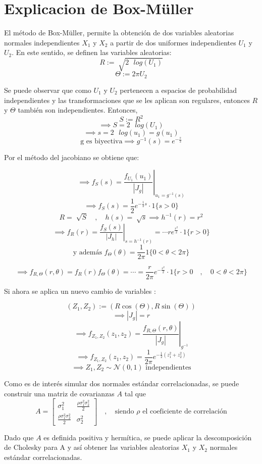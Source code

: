 \documentclass{article}
\begin{document}
\section{Explicacion de Box-Müller}

El método de Box-Müller, permite la obtención de dos variables aleatorias normales independientes $X_1$ y $X_2$ a partir de dos uniformes independientes $U_1$ y $U_2$. En este sentido, se definen las variables aleatorias:
\[	R := \sqrt[]{2 \textrm{ } log (U_1)}	\]
\[	\Theta := 2 \pi U_2	\]

Se puede observar que como $U_1$ y $U_2$ pertenecen a espacios de probabilidad independientes y las transformaciones que se les aplican son regulares, entonces $R$ y $\Theta$ también son independientes. Entonces,
\[	S := R^2	\]
\[	\implies S = 2 \textrm{ } log (U_1)	\]
\[	\implies s = 2 \textrm{ } log (u_1)	= g(u_1)\]
\[	\textrm{g es biyectiva} \implies g^{-1}(s) = e^{-\frac{s}{2}} \]

Por el método del jacobiano se obtiene que:

\[	\implies f_{S}(s) = \left.\frac{f_{U_1}(u_1)}{| J_g |}\right|_{u_1=g^{-1}(s)} \]
\[	\implies f_{S}(s) = \frac{1}{2} e^{-\frac{1}{2}s} \cdot 1 \{ s>0\} \]
\[	R = \sqrt[]{S} \quad,\quad	h(s)=\sqrt[]{s}	\implies h^{-1}(r)= r^2\]
\[	\implies f_{R}(r) = \left.\frac{f_{S}(s)}{| J_h |}\right|_{s=h^{-1}(r)} = \cdots r e^{\frac{r^2}{2}} \cdot 1 \{ r>0\} \]
\[ \textrm{y además } f_\Theta (\theta) = \frac{1}{2 \pi} 1 \{ 0 < \theta < 2 \pi \}\]

\[\implies f_{R,\Theta}(r,\theta)= f_{R}(r) f_\Theta (\theta) = \cdots = \frac{r}{2 \pi} e^{-\frac{r^2}{2}} \cdot 1 \{r>0 \quad,\quad 0 < \theta < 2 \pi \}\]

Si ahora se aplica un nuevo cambio de variables :

\[ (Z_1,Z_2) := (R \cos (\Theta), R \sin (\Theta))\]
\[\implies | J_g | = r \]
\[\implies f_{Z_1,Z_2}(z_1,z_2)= \left.\frac{f_{R,\Theta}(r,\theta)}{| J_g |}\right|_{g^{-1}}\]
\[\implies f_{Z_1,Z_2}(z_1,z_2)= \frac{1}{2\pi} e^{-\frac{1}{2}(z_1^2 + z_2^2)}\]
\[\implies Z_1,Z_2 \sim \mathcal{N}(0 , 1) \textrm{ independientes}\]

Como es de interés simular dos normales estándar correlacionadas, se puede construir una matriz de covarianzas $A$ tal que
\[ A =\begin{bmatrix}
\sigma^2_1 & \frac{\rho \sigma^2_1 \sigma^2_2}{2}\\
\frac{\rho \sigma^2_1 \sigma^2_2}{2} & \sigma^2_2
\end{bmatrix} \quad , \quad \textrm{siendo $\rho$ el coeficiente de correlación}\]

Dado que $A$ es definida positiva y hermítica, se puede aplicar la descomposición de Cholesky para A y así obtener las variables aleatorias $X_1$ y $X_2$ normales estándar correlacionadas.
\end{document}
